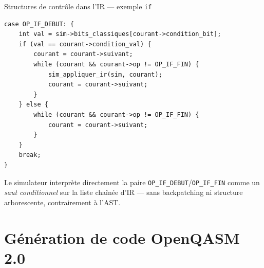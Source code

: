 \documentclass[10pt]{beamer}
\begin{document}
\begin{frame}[fragile]{Structures de contrôle dans l'IR --- exemple \texttt{if}}
\begin{lstlisting}[style=cstyle]
case OP_IF_DEBUT: {
    int val = sim->bits_classiques[courant->condition_bit];
    if (val == courant->condition_val) {
        courant = courant->suivant;
        while (courant && courant->op != OP_IF_FIN) {
            sim_appliquer_ir(sim, courant);
            courant = courant->suivant;
        }
    } else {
        while (courant && courant->op != OP_IF_FIN) {
            courant = courant->suivant;
        }
    }
    break;
}
\end{lstlisting}
  {\small Le simulateur interprète directement la paire \texttt{OP\_IF\_DEBUT}/\texttt{OP\_IF\_FIN} comme un \emph{saut conditionnel} sur la liste chaînée d'IR --- sans backpatching ni structure arborescente, contrairement à l'AST.}
\end{frame}

\section{Génération de code OpenQASM 2.0}
\end{document}
